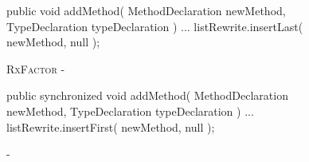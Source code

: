 \begin{figure}[H]
\begin{minipage}{0.48\textwidth}
\begin{sourcecode}
\begin{javacode}{3}
public void addMethod( MethodDeclaration newMethod, TypeDeclaration typeDeclaration ) {
	...
	listRewrite.insertLast( newMethod, null );
}
\end{javacode}
\caption{\textsc{RxFactor} - }
\label{code:2rx-addMethod}
\end{sourcecode}
\end{minipage}\hspace{0.7cm}
\begin{minipage}{0.48\textwidth}
\begin{sourcecode}
\begin{javacode}{3}
public synchronized void addMethod( MethodDeclaration newMethod, TypeDeclaration typeDeclaration ) {
	...
	listRewrite.insertFirst( newMethod, null );
}
\end{javacode}
\caption{\toolcore{} - }
\label{code:rxFactor-addMethod}
\end{sourcecode}
\end{minipage}
\end{figure}
